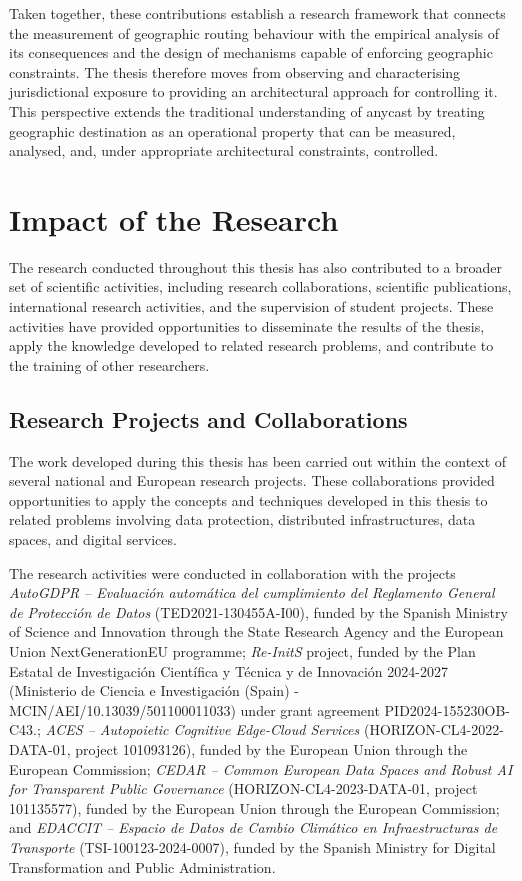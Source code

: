 \documentclass[
A4paper,                %
twoside,                %
openright,              %
chapterprefix=true,     %
12pt,                   %
headings=normal,        %
titlepage=on            %
]{book}
\begin{document}
Taken together, these contributions establish a research framework that connects the measurement of geographic routing behaviour with the empirical analysis of its consequences and the design of mechanisms capable of enforcing geographic constraints. The thesis therefore moves from observing and characterising jurisdictional exposure to providing an architectural approach for controlling it. This perspective extends the traditional understanding of anycast by treating geographic destination as an operational property that can be measured, analysed, and, under appropriate architectural constraints, controlled.

\section{Impact of the Research}
\label{sc:conclusion_impact}

The research conducted throughout this thesis has also contributed to a broader set of scientific activities, including research collaborations, scientific publications, international research activities, and the supervision of student projects. These activities have provided opportunities to disseminate the results of the thesis, apply the knowledge developed to related research problems, and contribute to the training of other researchers.

\subsection{Research Projects and Collaborations}
\label{sc:conclusion_projects}

The work developed during this thesis has been carried out within the context of several national and European research projects. These collaborations provided opportunities to apply the concepts and techniques developed in this thesis to related problems involving data protection, distributed infrastructures, data spaces, and digital services.

The research activities were conducted in collaboration with the projects \emph{AutoGDPR -- Evaluación automática del cumplimiento del Reglamento General de Protección de Datos} (TED2021-130455A-I00), funded by the Spanish Ministry of Science and Innovation through the State Research Agency and the European Union NextGenerationEU programme; \emph{Re-InitS} project, funded by the Plan Estatal de Investigación Científica y Técnica y de Innovación 2024-2027 (Ministerio de Ciencia e Investigación (Spain) - MCIN/AEI/10.13039/501100011033) under grant agreement PID2024-155230OB-C43.; \emph{ACES -- Autopoietic Cognitive Edge-Cloud Services} (HORIZON-CL4-2022-DATA-01, project 101093126), funded by the European Union through the European Commission; \emph{CEDAR -- Common European Data Spaces and Robust AI for Transparent Public Governance} (HORIZON-CL4-2023-DATA-01, project 101135577), funded by the European Union through the European Commission; and \emph{EDACCIT -- Espacio de Datos de Cambio Climático en Infraestructuras de Transporte} (TSI-100123-2024-0007), funded by the Spanish Ministry for Digital Transformation and Public Administration.
\end{document}
